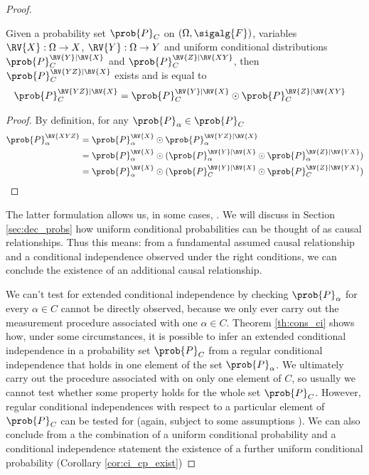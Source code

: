 \begin{proof}
\begin{theorem}\label{lem:joint_conditional}
Given a probability set $\prob{P}_C$ on $(\Omega,\sigalg{F})$, variables $\RV{X}:\Omega\to X$, $\RV{Y}:\Omega\to Y$ and uniform conditional distributions $\prob{P}_C^{\RV{Y}|\RV{X}}$ and $\prob{P}_C^{\RV{Z}|\RV{XY}}$, then $\prob{P}_C^{\RV{YZ}|\RV{X}}$ exists and is equal to
\begin{align}
    \prob{P}_C^{\RV{YZ}|\RV{X}} &= \prob{P}_C^{\RV{Y}|\RV{X}}\odot \prob{P}_C^{\RV{Z}|\RV{XY}}
\end{align}
\end{theorem}

\begin{proof}
By definition, for any $\prob{P}_\alpha\in \prob{P}_C$
\begin{align}
    \prob{P}_\alpha^{\RV{XYZ}} &= \prob{P}_\alpha^{\RV{X}}\odot \prob{P}_\alpha^{\RV{YZ}|\RV{X}}\\
                               &= \prob{P}_\alpha^{\RV{X}}\odot(\prob{P}_\alpha^{\RV{Y}|\RV{X}}\odot \prob{P}_\alpha^{\RV{Z}|\RV{YX}})\\
                               &= \prob{P}_\alpha^{\RV{X}}\odot(\prob{P}_C^{\RV{Y}|\RV{X}}\odot \prob{P}_C^{\RV{Z}|\RV{YX}})
\end{align}
\end{proof}


The latter formulation allows us, in some cases, . We will discuss in Section \ref{sec:dec_probs} how uniform conditional probabilities can be thought of as causal relationships. Thus this means: from a fundamental assumed causal relationship and a conditional independence observed under the right conditions, we can conclude the existence of an additional causal relationship. 

We can't test for extended conditional independence by checking $\prob{P}_\alpha$ for every $\alpha\in C$ cannot be directly observed, because we only ever carry out the measurement procedure associated with one $\alpha\in C$. Theorem \ref{th:cons_ci} shows how, under some circumstances, it is possible to infer an extended conditional independence in a probability set $\prob{P}_C$ from a regular conditional independence that holds in one element of the set $\prob{P}_\alpha$. We ultimately carry out the procedure associated with on only one element of $C$, so usually we cannot test whether some property holds for the whole set $\prob{P}_C$. However, regular conditional independences with respect to a particular element of $\prob{P}_C$ can be tested for (again, subject to some assumptions \citep{shah_hardness_2020}). We can also conclude from a the combination of a uniform conditional probability and a conditional independence statement the existence of a further uniform conditional probability (Corollary \ref{cor:ci_cp_exist})


\end{proof}

